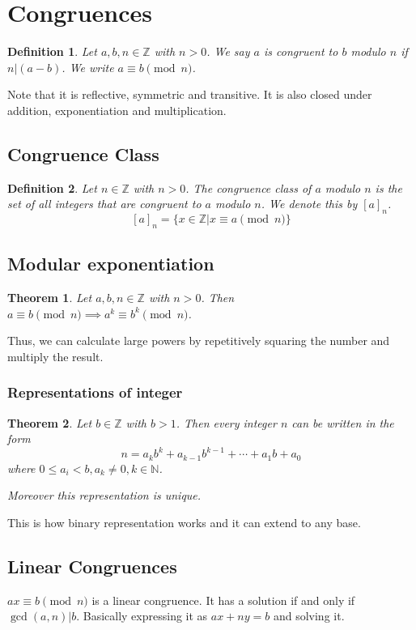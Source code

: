 \documentclass[letterpaper,12pt,oneside]{article}
\newtheorem{theorem}{Theorem}
\newtheorem{definition}{Definition}
\begin{document}
\section{Congruences}
\begin{definition}
    Let $a,b,n\in \mathbb{Z}$ with $n>0$. We say $a$ is congruent to $b$ modulo $n$ if $n|(a-b)$. We write $a\equiv b\pmod{n}$.
\end{definition}
Note that it is reflective, symmetric and transitive. It is also closed under addition, exponentiation and multiplication.
\subsection{Congruence Class}
\begin{definition}
    Let $n\in \mathbb{Z}$ with $n>0$. The congruence class of $a$ modulo $n$ is the set of all integers that are congruent to $a$ modulo $n$. We denote this by $[a]_n$. \[
        [a]_n = \{x\in \mathbb{Z}|x\equiv a\pmod{n}\}
    \]
\end{definition}
\subsection{Modular exponentiation}
\begin{theorem}
    Let $a,b,n\in \mathbb{Z}$ with $n>0$. Then $a\equiv b\pmod{n} \implies a^k\equiv b^k\pmod{n}$.
\end{theorem}
Thus, we can calculate large powers by repetitively squaring the number and multiply the result.
\subsubsection{Representations of integer}
\begin{theorem}
    Let $b\in \mathbb{Z}$ with $b>1$. Then every integer $n$ can be written in the form\[
        n = a_k b^k + a_{k-1}b^{k-1}+\cdots + a_1b + a_0
    \]
    where $0\leq a_i < b, a_k\neq 0, k\in \mathbb{N}$.

    Moreover this representation is unique.
\end{theorem}
This is how binary representation works and it can extend to any base.
\subsection{Linear Congruences}
$ax\equiv b\pmod{n}$ is a linear congruence. It has a solution if and only if $\gcd(a,n)|b$. Basically expressing it as $ax+ny=b$ and solving it.
\end{document}
